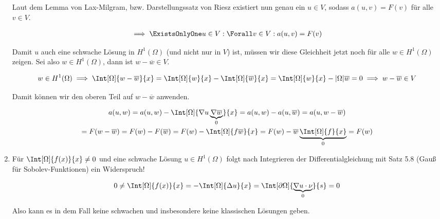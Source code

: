 \begin{solution}
\begin{enumerate}[label = \alph*)]
\begin{enumerate}[label = \arabic*.]
    \end{enumerate}

    Laut dem Lemma von Lax-Milgram, bzw. Darstellungssatz von Riesz existiert nun genau ein $u \in V$, sodass $a(u, v) = F(v)$ für alle $v \in V$.

    \begin{align*}
        \implies
        \ExistsOnlyOne u \in V:
        \Forall v \in V:
        a(u, v) = F(v)
    \end{align*}

    Damit $u$ auch eine schwache Lösung in $H^1(\Omega)$ (und nicht nur in $V$) ist, müssen wir diese Gleichheit jetzt noch für alle $w \in H^1(\Omega)$ zeigen.
    Sei also $w \in H^1(\Omega)$, dann ist $w - \overline{w} \in V$.

    \begin{align*}
        w \in H^1(\Omega)
        \implies
        \Int[\Omega]{w - \overline{w}}{x}
        =
        \Int[\Omega]{w}{x} - \Int[\Omega]{\overline{w}}{x}
        =
        \Int[\Omega]{w}{x} - |\Omega| \overline{w}
        =
        0
        \implies
        w - \overline{w} \in V
    \end{align*}

    Damit können wir den oberen Teil auf $w - \overline{w}$ anwenden.

    \begin{multline*}
        a(u, w)
        =
        a(u, w) - \Int[\Omega]{\nabla u \underbrace{\nabla \overline{w}}_0}{x}
        =
        a(u, w) - a(u, \overline{w})
        =
        a(u, w - \overline{w}) \\
        =
        F(w - \overline{w})
        =
        F(w) - F(\overline{w})
        =
        F(w) - \Int[\Omega]{f \overline{w}}{x}
        =
        F(w) - \overline{w} \underbrace{\Int[\Omega]{f}{x}}_0
        =
        F(w)
    \end{multline*}

    \item Für $\Int[\Omega]{f(x)}{x} \neq 0$ und eine schwache Lösung $u \in H^1(\Omega)$ folgt
    nach Integrieren der Differentialgleichung mit Satz 5.8 (Gauß für Sobolev-Funktionen) ein Widerspruch!

    \begin{align*}
        0
        \neq
        \Int[\Omega]{f(x)}{x}
        =
        -\Int[\Omega]{\Delta u}{x}
        =
        \Int[\partial \Omega]{\underbrace{\nabla u \cdot \nu}_0}{s}
        =
        0
    \end{align*}

    Also kann es in dem Fall keine schwachen und insbesondere keine klassischen Lösungen geben.

\end{enumerate}

\end{solution}

